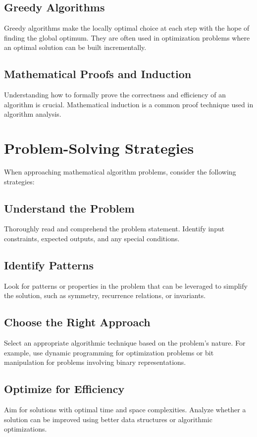 \subsection{Greedy Algorithms}
Greedy algorithms make the locally optimal choice at each step with the hope of finding the global optimum. They are often used in optimization problems where an optimal solution can be built incrementally.

\subsection{Mathematical Proofs and Induction}
Understanding how to formally prove the correctness and efficiency of an algorithm is crucial. Mathematical induction is a common proof technique used in algorithm analysis.

\section{Problem-Solving Strategies}
When approaching mathematical algorithm problems, consider the following strategies:

\subsection{Understand the Problem}
Thoroughly read and comprehend the problem statement. Identify input constraints, expected outputs, and any special conditions.

\subsection{Identify Patterns}
Look for patterns or properties in the problem that can be leveraged to simplify the solution, such as symmetry, recurrence relations, or invariants.

\subsection{Choose the Right Approach}
Select an appropriate algorithmic technique based on the problem's nature. For example, use dynamic programming for optimization problems or bit manipulation for problems involving binary representations.

\subsection{Optimize for Efficiency}
Aim for solutions with optimal time and space complexities. Analyze whether a solution can be improved using better data structures or algorithmic optimizations.

